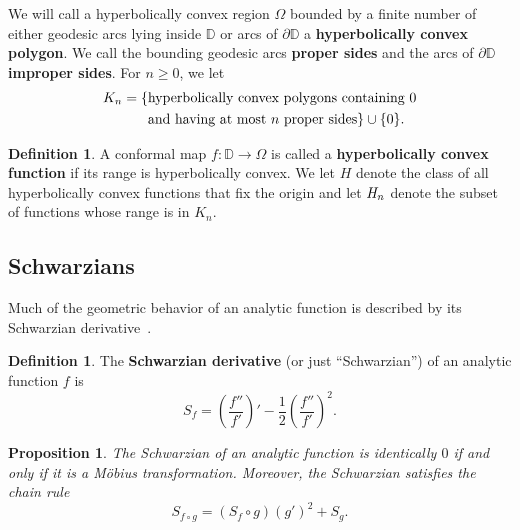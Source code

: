 \documentclass[12pt]{icgft}
\newcommand{\D}{\mathbb D}
\newtheorem{proposition}[theorem]{Proposition}
\theoremstyle{definition}
\newtheorem{definition}[theorem]{Definition}
\numberwithin{equation}{section}
\begin{document}
We will call a
hyperbolically convex region $\Omega$ bounded by a finite number of
either geodesic arcs lying inside $\D$ or arcs of $\partial \D$ a
\textbf{hyperbolically convex polygon}.
We call the bounding geodesic arcs \textbf{proper sides} and the arcs
of $\partial \D$ \textbf{improper sides}.
For $n\geq 0$, we let
\begin{align}\notag
K_n=\{&\text{hyperbolically convex polygons  containing $0$}\\\notag
& \text{and  having
at most $n$ proper sides}\}
\cup\{0\}.
\end{align}



\begin{definition}A conformal map $f:\D\to\Omega$ is called a
\textbf{hyperbolically convex function} if its range is hyperbolically convex.
We let $\mathbf {\mathit H}$
denote the class of all hyperbolically convex functions that fix the origin
 and let $\bf{\mathit H_{\mathit n}}$ denote the subset of functions whose range
is in $K_n$.
\end{definition}





\subsection{Schwarzians}

Much of the geometric behavior of an analytic function is described by
its Schwarzian derivative~\cite{GL2000,oL87}.

\begin{definition}
The \textbf{Schwarzian derivative} (or just ``Schwarzian'') of an
analytic function $f$ is
\[
S_f = \left( \frac{f''}{f'} \right)' - \frac12 \left( \frac{f''}{f'}
\right)^2 .
\]
\end{definition}


\begin{proposition} The Schwarzian of an analytic function is identically $0$
 if and only if it is a M\"obius
transformation.  Moreover, the Schwarzian satisfies the chain rule
\[
S_{f\circ g}=\left(S_f \circ g\right)\left(g'\right)^2 + S_g.
\]
\end{proposition}
\end{document}
